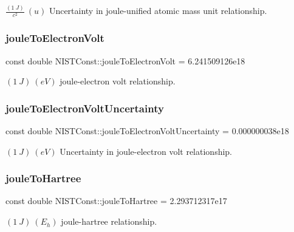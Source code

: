 $\frac{(1\ J)}{c^2} \ (u)$ Uncertainty in joule-\/unified atomic mass unit relationship. \mbox{\label{group___n_i_s_t_const-_joule_ga08ffcdfd701ba898a91b0cbdde4d0e2d}} 
\subsubsection{\texorpdfstring{joule\+To\+Electron\+Volt}{jouleToElectronVolt}}
{\footnotesize\ttfamily const double N\+I\+S\+T\+Const\+::joule\+To\+Electron\+Volt = 6.\+241509126e18}

$(1\ J) \ (eV)$ joule-\/electron volt relationship. \mbox{\label{group___n_i_s_t_const-_joule_ga36506e3cfb40cd74646e95340c9c4721}} 
\subsubsection{\texorpdfstring{joule\+To\+Electron\+Volt\+Uncertainty}{jouleToElectronVoltUncertainty}}
{\footnotesize\ttfamily const double N\+I\+S\+T\+Const\+::joule\+To\+Electron\+Volt\+Uncertainty = 0.\+000000038e18}

$(1\ J) \ (eV)$ Uncertainty in joule-\/electron volt relationship. \mbox{\label{group___n_i_s_t_const-_joule_gac067d2d31bf56c3abe63559dac6c00d7}} 
\subsubsection{\texorpdfstring{joule\+To\+Hartree}{jouleToHartree}}
{\footnotesize\ttfamily const double N\+I\+S\+T\+Const\+::joule\+To\+Hartree = 2.\+293712317e17}

$(1\ J) \ (E_h)$ joule-\/hartree relationship. \mbox{\label{group___n_i_s_t_const-_joule_ga503d276676014580036110b6554bd974}} 
